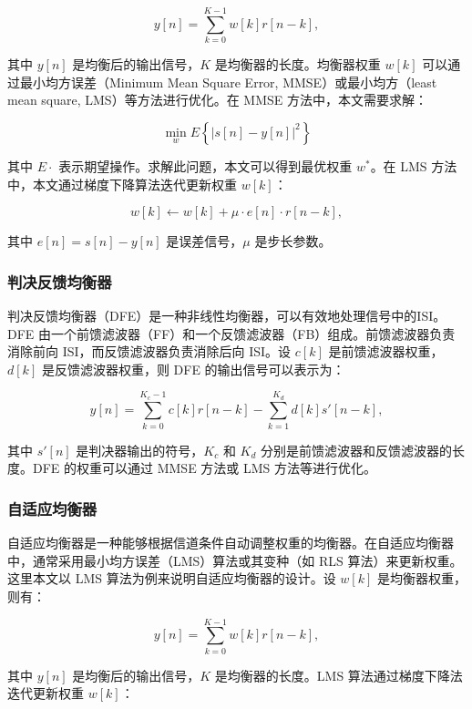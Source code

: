 \documentclass[UTF8,a4paper,12pt]{ctexart}
\numberwithin{equation}{section}
\begin{document}
\begin{equation}
	y[n] = \sum_{k=0}^{K-1} w[k] r[n-k],
\end{equation}

其中 $y[n]$ 是均衡后的输出信号，$K$ 是均衡器的长度。均衡器权重 $w[k]$ 可以通过最小均方误差（Minimum Mean Square Error, MMSE）或最小均方（least mean square, LMS）等方法进行优化。在 MMSE 方法中，本文需要求解：

\begin{equation}
	\min_w E\left\{ |s[n] - y[n]|^2 \right\}
\end{equation}


其中 $E{\cdot}$ 表示期望操作。求解此问题，本文可以得到最优权重 $w^*$。在 LMS 方法中，本文通过梯度下降算法迭代更新权重 $w[k]$：

\begin{equation}
	w[k] \leftarrow w[k] + \mu \cdot e[n] \cdot r[n-k],
\end{equation}

其中 $e[n] = s[n] - y[n]$ 是误差信号，$\mu$ 是步长参数。
\subsubsection{判决反馈均衡器}
判决反馈均衡器（DFE）是一种非线性均衡器，可以有效地处理信号中的ISI。DFE 由一个前馈滤波器（FF）和一个反馈滤波器（FB）组成。前馈滤波器负责消除前向 ISI，而反馈滤波器负责消除后向 ISI。设 $c[k]$ 是前馈滤波器权重，$d[k]$ 是反馈滤波器权重，则 DFE 的输出信号可以表示为：

\begin{equation}
	y[n] = \sum_{k=0}^{K_c-1} c[k] r[n-k] - \sum_{k=1}^{K_d} d[k] s'[n-k],
\end{equation}

其中 $s'[n]$ 是判决器输出的符号，$K_c$ 和 $K_d$ 分别是前馈滤波器和反馈滤波器的长度。DFE 的权重可以通过 MMSE 方法或 LMS 方法等进行优化。
\subsubsection{自适应均衡器}
自适应均衡器是一种能够根据信道条件自动调整权重的均衡器。在自适应均衡器中，通常采用最小均方误差（LMS）算法或其变种（如 RLS 算法）来更新权重。这里本文以 LMS 算法为例来说明自适应均衡器的设计。设 $w[k]$ 是均衡器权重，则有：

\begin{equation}
	y[n] = \sum_{k=0}^{K-1} w[k] r[n-k],
\end{equation}

其中 $y[n]$ 是均衡后的输出信号，$K$ 是均衡器的长度。LMS 算法通过梯度下降法迭代更新权重 $w[k]$：
\end{document}
